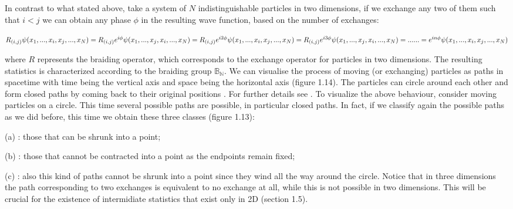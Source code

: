 \documentclass{Configuration_Files/PoliMi3i_thesis}
\begin{document}
	

In contrast to what stated above, take a system of $N$ indistinguishable particles in two dimensions, if we exchange any two of them such that $i<j$ we can obtain any phase $\phi$ in the resulting wave function, based on the number of exchanges:  

\begin{center}	
	$R_{(i,j)}\psi(x_1, ..., x_i,x_j, ..., x_N)=R_{(i,j)} e^{i\phi} \psi(x_1, ..., x_j,x_i, ..., x_N)= R_{(i,j)} e^{i2\phi} \psi(x_1, ..., x_i,x_j, ..., x_N)=R_{(i,j)} e^{i3\phi} \psi(x_1, ..., x_j,x_i, ..., x_N)= ... \ \newline
	... = e^{in\phi} \psi(x_1, ..., x_i,x_j, ..., x_N)$
\end{center}

where $R$ represents the braiding operator, which corresponds to the exchange operator for particles in two dimensions. The resulting statistics is characterized according to the braiding group  $\mathbb{B_N}$. We can visualise the process of moving (or exchanging) particles as paths in spacetime with time being the vertical axis and space being the horizontal axis (figure 1.14). The particles can circle around each other and form closed paths by coming back to their original positions {\cite{Wil91}}. For further details see {\cite{Rao16, Wil91}}.
To visualize the above behaviour, consider moving particles on a circle. This time several possible paths are possible, in particular closed paths. In fact, if we classify again the possible paths as we did before, this time we obtain these three classes (figure 1.13):

\begin{center}
	\item[(a)] : those that can be shrunk into a point;

	\item[(b)] : those that cannot be contracted into a point as the endpoints remain fixed;

	\item[(c)] : also this kind of paths cannot be shrunk into a point since they wind all  the way around the circle. Notice that in three dimensions the path corresponding to two exchanges is equivalent to no exchange at all, while this is not possible in two dimensions. This will be crucial for the existence of intermidiate statistics that exist only in 2D (section 1.5).
\end{center}
\end{document}
